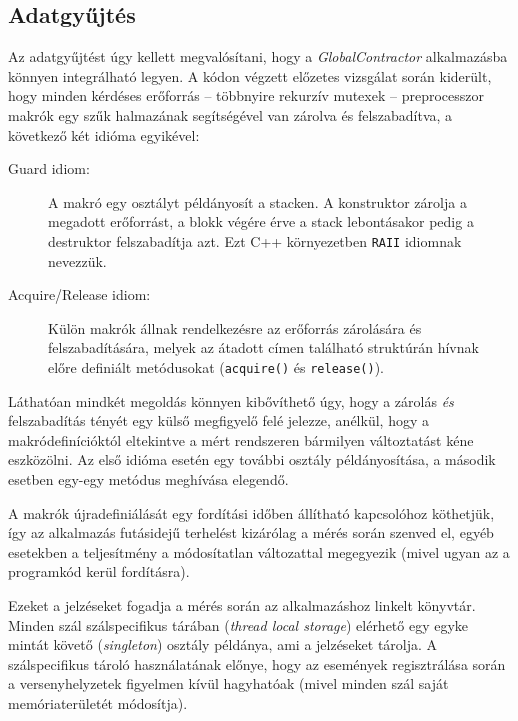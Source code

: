     \subsection{Adatgyűjtés}
    Az adatgyűjtést úgy kellett megvalósítani, hogy a \emph{GlobalContractor} alkalmazásba könnyen integrálható legyen. A kódon végzett előzetes vizsgálat során kiderült, hogy minden kérdéses erőforrás -- többnyire rekurzív mutexek -- preprocesszor makrók egy szűk halmazának segítségével van zárolva és felszabadítva, a következő két idióma egyikével:
    
    \begin{description}
        \item[Guard idiom:] A makró egy osztályt példányosít a stacken. A konstruktor zárolja a megadott erőforrást, a blokk végére érve a stack lebontásakor pedig a destruktor felszabadítja azt. Ezt C++ környezetben \texttt{RAII} idiomnak nevezzük.
        \item[Acquire/Release idiom:] Külön makrók állnak rendelkezésre az erőforrás zárolására és felszabadítására, melyek az átadott címen található struktúrán hívnak előre definiált metódusokat (\texttt{acquire()} és \texttt{release()}).
    \end{description}
%    
    Láthatóan mindkét megoldás könnyen kibővíthető úgy, hogy a zárolás \emph{és} felszabadítás tényét egy külső megfigyelő felé jelezze, anélkül, hogy a makródefinícióktól eltekintve a mért rendszeren bármilyen változtatást kéne eszközölni. Az első idióma esetén egy további osztály példányosítása, a második esetben egy-egy metódus meghívása elegendő.
    
    A makrók újradefiniálását egy fordítási időben állítható kapcsolóhoz köthetjük, így az alkalmazás futásidejű terhelést kizárólag a mérés során szenved el, egyéb esetekben a teljesítmény a módosítatlan változattal megegyezik (mivel ugyan az a programkód kerül fordításra).

\medskip    
\lstset{
    basicstyle=\footnotesize\ttfamily
}    
    
\medskip

\noindent    
Ezeket a jelzéseket fogadja a mérés során az alkalmazáshoz linkelt könyvtár. Minden szál szálspecifikus tárában (\emph{thread local storage}) elérhető egy egyke mintát követő (\emph{singleton}) osztály példánya, ami a jelzéseket tárolja. A szálspecifikus tároló használatának előnye, hogy az események regisztrálása során a versenyhelyzetek figyelmen kívül hagyhatóak (mivel minden szál saját memóriaterületét módosítja).
    

